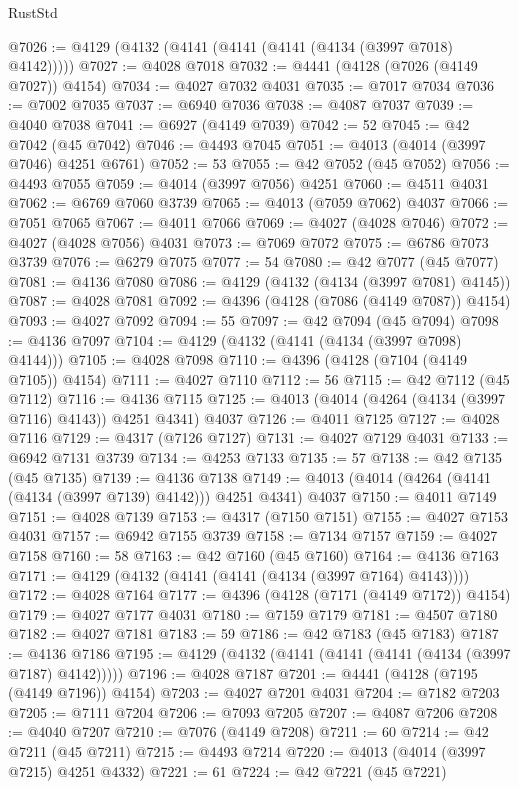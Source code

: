 \begin{lexlean}{RustStd}
\begin{coremodule}
@7026 := @4129 (@4132 (@4141 (@4141 (@4141 (@4134 (@3997 @7018) @4142)))))
@7027 := @4028 @7018
@7032 := @4441 (@4128 (@7026 (@4149 @7027)) @4154)
@7034 := @4027 @7032 @4031
@7035 := @7017 @7034
@7036 := @7002 @7035
@7037 := @6940 @7036
@7038 := @4087 @7037
@7039 := @4040 @7038
@7041 := @6927 (@4149 @7039)
@7042 := 52
@7045 := @42 @7042 (@45 @7042)
@7046 := @4493 @7045
@7051 := @4013 (@4014 (@3997 @7046) @4251 @6761)
@7052 := 53
@7055 := @42 @7052 (@45 @7052)
@7056 := @4493 @7055
@7059 := @4014 (@3997 @7056) @4251
@7060 := @4511 @4031
@7062 := @6769 @7060 @3739
@7065 := @4013 (@7059 @7062) @4037
@7066 := @7051 @7065
@7067 := @4011 @7066
@7069 := @4027 (@4028 @7046)
@7072 := @4027 (@4028 @7056) @4031
@7073 := @7069 @7072
@7075 := @6786 @7073 @3739
@7076 := @6279 @7075
@7077 := 54
@7080 := @42 @7077 (@45 @7077)
@7081 := @4136 @7080
@7086 := @4129 (@4132 (@4134 (@3997 @7081) @4145))
@7087 := @4028 @7081
@7092 := @4396 (@4128 (@7086 (@4149 @7087)) @4154)
@7093 := @4027 @7092
@7094 := 55
@7097 := @42 @7094 (@45 @7094)
@7098 := @4136 @7097
@7104 := @4129 (@4132 (@4141 (@4134 (@3997 @7098) @4144)))
@7105 := @4028 @7098
@7110 := @4396 (@4128 (@7104 (@4149 @7105)) @4154)
@7111 := @4027 @7110
@7112 := 56
@7115 := @42 @7112 (@45 @7112)
@7116 := @4136 @7115
@7125 := @4013 (@4014 (@4264 (@4134 (@3997 @7116) @4143)) @4251 @4341) @4037
@7126 := @4011 @7125
@7127 := @4028 @7116
@7129 := @4317 (@7126 @7127)
@7131 := @4027 @7129 @4031
@7133 := @6942 @7131 @3739
@7134 := @4253 @7133
@7135 := 57
@7138 := @42 @7135 (@45 @7135)
@7139 := @4136 @7138
@7149 := @4013 (@4014 (@4264 (@4141 (@4134 (@3997 @7139) @4142))) @4251 @4341) @4037
@7150 := @4011 @7149
@7151 := @4028 @7139
@7153 := @4317 (@7150 @7151)
@7155 := @4027 @7153 @4031
@7157 := @6942 @7155 @3739
@7158 := @7134 @7157
@7159 := @4027 @7158
@7160 := 58
@7163 := @42 @7160 (@45 @7160)
@7164 := @4136 @7163
@7171 := @4129 (@4132 (@4141 (@4141 (@4134 (@3997 @7164) @4143))))
@7172 := @4028 @7164
@7177 := @4396 (@4128 (@7171 (@4149 @7172)) @4154)
@7179 := @4027 @7177 @4031
@7180 := @7159 @7179
@7181 := @4507 @7180
@7182 := @4027 @7181
@7183 := 59
@7186 := @42 @7183 (@45 @7183)
@7187 := @4136 @7186
@7195 := @4129 (@4132 (@4141 (@4141 (@4141 (@4134 (@3997 @7187) @4142)))))
@7196 := @4028 @7187
@7201 := @4441 (@4128 (@7195 (@4149 @7196)) @4154)
@7203 := @4027 @7201 @4031
@7204 := @7182 @7203
@7205 := @7111 @7204
@7206 := @7093 @7205
@7207 := @4087 @7206
@7208 := @4040 @7207
@7210 := @7076 (@4149 @7208)
@7211 := 60
@7214 := @42 @7211 (@45 @7211)
@7215 := @4493 @7214
@7220 := @4013 (@4014 (@3997 @7215) @4251 @4332)
@7221 := 61
@7224 := @42 @7221 (@45 @7221)

\end{coremodule}
\end{lexlean}
